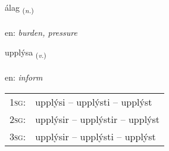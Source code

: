 \documentclass[frontgrid, backgrid]{flacards}\usepackage[]{graphicx}\usepackage[]{color}
\begin{document}
{álag \small{\textsubscript{(\textit{n.})}} \\[1ex] %
\textphonetic{[auːlaɣ]} \\
en: \emph{burden, pressure} \\  [2ex]
\renewcommand*{\arraystretch}{0.8}
}

\renewcommand{\flhead}{\vskip5pt \fboxsep=0pt {\small\bfseries\footnotesize Sagnorð | Verb}}
\renewcommand{\fcfoot}{\vskip5pt \fboxsep=0pt \hspace{2pt}{\small\bfseries\footnotesize 2K}}

\renewcommand{\blhead}{\vskip5pt {\small\bfseries\footnotesize Sagnorð | Verb }}
\renewcommand{\bcfoot}{\vskip5pt \hspace{2pt}{\small\bfseries\footnotesize 2K}}


{upplýsa \small{\textsubscript{(\textit{v.})}} \\[1ex] %
\textphonetic{[ʏhplisa]} \\
en: \emph{inform} \\  [2ex]
\renewcommand*{\arraystretch}{0.8}
\begin{tabular}{p{1cm}l}
\textsc{1sg}: & upplýsi -- upplýsti -- upplýst \\ 
\textsc{2sg}: & upplýsir -- upplýstir -- upplýst \\ 
\textsc{3sg}: & upplýsir -- upplýsti -- upplýst \\ 
\end{tabular}
}

\renewcommand{\flhead}{\vskip5pt \fboxsep=0pt {\small\bfseries\footnotesize Nafnorð | Noun}}
\renewcommand{\fcfoot}{\vskip5pt \fboxsep=0pt \hspace{2pt}{\small\bfseries\footnotesize 2K}}
\end{document}
